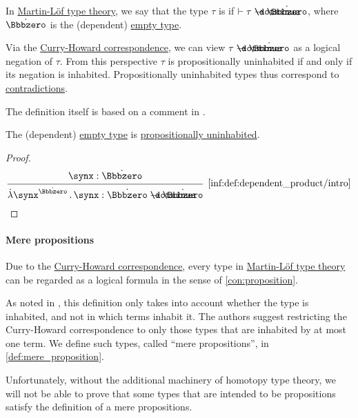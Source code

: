 \begin{definition}\label{def:propositionally_uninhabited}\mimprovised
  In \hyperref[def:mltt]{Martin-L\"of type theory}, we say that the type \( \tau \) is  if \( \vdash \tau \synimplies \syn\Bbbzero \), where \( \syn\Bbbzero \) is the (dependent) \hyperref[def:dependent_empty_type]{empty type}.
\end{definition}
\begin{comments}
  \item Via the \hyperref[con:curry_howard_correspondence]{Curry-Howard correspondence}, we can view \( \tau \synimplies \syn\Bbbzero \) as a logical negation of \( \tau \). From this perspective \( \tau \) is propositionally uninhabited if and only if its negation is inhabited. Propositionally uninhabited types thus correspond to \hyperref[def:propositional_contradiction]{contradictions}.

  The definition itself is based on a comment in \cite[47]{UnivalentFoundationsProgram2024OctoberHoTT}.
\end{comments}

\begin{proposition}\label{thm:empty_type_is_uninhabited}
  The (dependent) \hyperref[def:dependent_empty_type]{empty type} is \hyperref[def:propositionally_uninhabited]{propositionally uninhabited}.
\end{proposition}
\begin{proof}
  \begin{equation*}
    \begin{prooftree}
      \hypo{ \synx: \syn\Bbbzero }
      \infer1[\ref{inf:def:dependent_product/intro}]{ \qabs {\synx^{\syn\Bbbzero}} \synx: \syn\Bbbzero \synimplies \syn\Bbbzero }.
    \end{prooftree}
  \end{equation*}
\end{proof}

\paragraph{Mere propositions}

\begin{remark}\label{rem:mere_propositions}
  Due to the \hyperref[con:curry_howard_correspondence]{Curry-Howard correspondence}, every type in \hyperref[def:mltt]{Martin-L\"of type theory} can be regarded as a logical formula in the sense of \cref{con:proposition}.

  As noted in \cite[111]{UnivalentFoundationsProgram2024OctoberHoTT}, this definition only takes into account whether the type is inhabited, and not in which terms inhabit it. The authors suggest restricting the Curry-Howard correspondence to only those types that are inhabited by at most one term. We define such types, called \enquote{mere propositions}, in \cref{def:mere_proposition}.

  Unfortunately, without the additional machinery of homotopy type theory, we will not be able to prove that some types that are intended to be propositions satisfy the definition of a mere propositions.
\end{remark}

